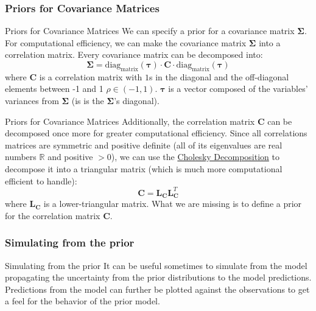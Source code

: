 \subsubsection{Priors for Covariance Matrices}
\begin{frame}{Priors for Covariance Matrices}
	We can specify a prior for a covariance matrix
	$\boldsymbol{\Sigma}$.
	\vfill
	For computational efficiency,
	we can make the covariance matrix $\boldsymbol{\Sigma}$ into a correlation matrix.
	Every covariance matrix can be decomposed into:
	$$
		\boldsymbol{\Sigma}=\text{diag}_\text{matrix}(\boldsymbol{\tau}) \cdot \mathbf{C} \cdot \text{diag}_\text{matrix}(\boldsymbol{\tau})
	$$
	where $\mathbf{C}$ is a correlation matrix with
	$1$s in the diagonal and the off-diagonal elements between -1 and 1 $\rho \in (-1, 1)$.
	$\boldsymbol{\tau}$ is a vector composed of the variables' variances from
	$\boldsymbol{\Sigma}$ (is is the $\boldsymbol{\Sigma}$'s diagonal).
\end{frame}

\begin{frame}{Priors for Covariance Matrices}
	\small
	Additionally, the correlation matrix $\mathbf{C}$
	can be decomposed once more for greater computational efficiency.
	Since all correlations matrices are symmetric and positive definite
	(all of its eigenvalues are real numbers $\mathbb{R}$ and positive $>0$),
	we can use the \href{https://en.wikipedia.org/wiki/Cholesky_decomposition}
	{Cholesky Decomposition}
	to decompose it into a triangular matrix
	(which is much more computational efficient to handle):
	$$
		\mathbf{C} = \mathbf{L}_{\mathbf{C}} \mathbf{L}^T_{\mathbf{C}}
	$$
	where $\mathbf{L}_{\mathbf{C}}$ is a lower-triangular matrix.
	\vfill
	What we are missing is to define a prior for the correlation matrix $\mathbf{C}$.
\end{frame}

\subsubsection{Simulating from the prior}
\begin{frame}{Simulating from the prior}
It can be useful sometimes to simulate from the model propagating the uncertainty from the prior distributions to the model predictions.
\vfill
Predictions from the model can further be plotted against the observations to get a feel for the behavior of the prior model. 
\end{frame}
